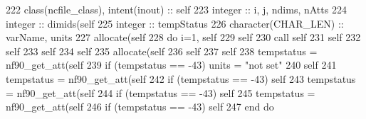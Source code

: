 \begin{DoxyCode}
222     \textcolor{keywordtype}{class}(ncfile\_class), \textcolor{keywordtype}{intent(inout)} :: self
223     \textcolor{keywordtype}{integer} :: i, j, ndims, nAtts
224     \textcolor{keywordtype}{integer} :: dimids(self%
225     \textcolor{keywordtype}{integer} :: tempStatus
226     \textcolor{keywordtype}{character(CHAR\_LEN)} :: varName, units
227     \textcolor{keyword}{allocate}(self%
228     \textcolor{keywordflow}{do} i=1, self%
229         self%
230         \textcolor{keyword}{call }self%
231         self%
232         self%
233         self%
234         self%
235         \textcolor{keyword}{allocate}(self%
236         self%
237         self%
238         tempstatus = nf90\_get\_att(self%
239         \textcolor{keywordflow}{if} (tempstatus == -43) units = \textcolor{stringliteral}{"not set"}
240         self%
241         tempstatus = nf90\_get\_att(self%
242         \textcolor{keywordflow}{if} (tempstatus == -43) self%
243         tempstatus = nf90\_get\_att(self%
244         \textcolor{keywordflow}{if} (tempstatus == -43) self%
245         tempstatus = nf90\_get\_att(self%
246         \textcolor{keywordflow}{if} (tempstatus == -43) self%
247 \textcolor{keywordflow}{    end do}
\end{DoxyCode}
\mbox{\label{namespacenetcdfparser__mod_aba877869db6bea7262d659133253cff7}} 
